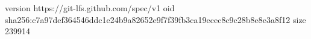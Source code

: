 version https://git-lfs.github.com/spec/v1
oid sha256:c7a97def364546ddc1e24b9a82652e9f7f39fb3ca19ecec8c9c28b8e8e3a8f12
size 239914

